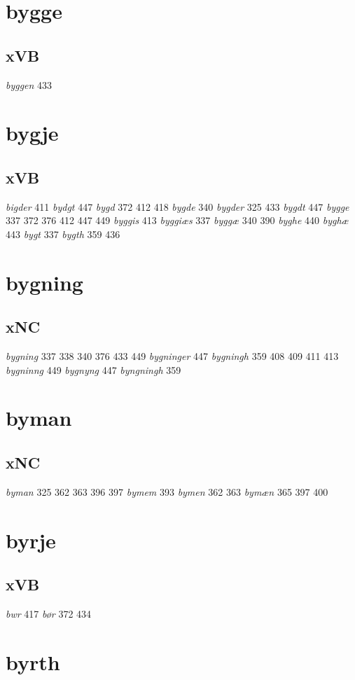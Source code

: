 \documentclass[a4paper,twocolumn]{article}
\begin{document}
\section{bygge}
\label{sec:org6bc27a8}
\subsection{xVB}
\label{sec:org96f7308}
\emph{byggen} 433 
\section{bygje}
\label{sec:orgb12e85a}
\subsection{xVB}
\label{sec:org8593030}
\emph{bigder} 411 \emph{bydgt} 447 \emph{bygd} 372 412 418 \emph{bygde} 340 \emph{bygder} 325 433 \emph{bygdt} 447 \emph{bygge} 337 372 376 412 447 449 \emph{byggis} 413 \emph{byggiæs} 337 \emph{byggæ} 340 390 \emph{byghe} 440 \emph{byghæ} 443 \emph{bygt} 337 \emph{bygth} 359 436 
\section{bygning}
\label{sec:orgfd9c90c}
\subsection{xNC}
\label{sec:org796ec7b}
\emph{bygning} 337 338 340 376 433 449 \emph{bygninger} 447 \emph{bygningh} 359 408 409 411 413 \emph{bygninng} 449 \emph{bygnyng} 447 \emph{byngningh} 359 
\section{byman}
\label{sec:org2e010c7}
\subsection{xNC}
\label{sec:org0664f64}
\emph{byman} 325 362 363 396 397 \emph{bymem} 393 \emph{bymen} 362 363 \emph{bymæn} 365 397 400 
\section{byrje}
\label{sec:orgab42ead}
\subsection{xVB}
\label{sec:org8d25b51}
\emph{bwr} 417 \emph{bør} 372 434 
\section{byrth}
\label{sec:org5bf02aa}
\end{document}
